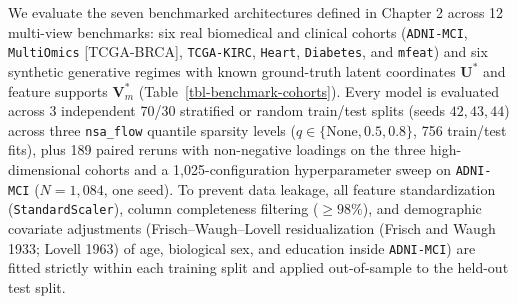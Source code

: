 \documentclass[
  10pt,
  letterpaper,
]{report}
\begin{document}
We evaluate the seven benchmarked architectures defined in Chapter 2
across 12 multi-view benchmarks: six real biomedical and clinical
cohorts (\texttt{ADNI-MCI}, \texttt{MultiOmics} {[}TCGA-BRCA{]},
\texttt{TCGA-KIRC}, \texttt{Heart}, \texttt{Diabetes}, and
\texttt{mfeat}) and six synthetic generative regimes with known
ground-truth latent coordinates \(\mathbf{U}^*\) and feature supports
\(\mathbf{V}_m^*\) (Table~\ref{tbl-benchmark-cohorts}). Every model is
evaluated across 3 independent 70/30 stratified or random train/test
splits (seeds \(42, 43, 44\)) across three \texttt{nsa\_flow} quantile
sparsity levels (\(q \in \{\text{None}, 0.5, 0.8\}\), 756 train/test
fits), plus 189 paired reruns with non-negative loadings on the three
high-dimensional cohorts and a 1,025-configuration hyperparameter sweep
on \texttt{ADNI-MCI} (\(N = 1,084\), one seed). To prevent data leakage,
all feature standardization (\texttt{StandardScaler}), column
completeness filtering (\(\ge 98\%\)), and demographic covariate
adjustments (Frisch--Waugh--Lovell residualization (Frisch and Waugh
1933; Lovell 1963) of age, biological sex, and education inside
\texttt{ADNI-MCI}) are fitted strictly within each training split and
applied out-of-sample to the held-out test split.
\end{document}
